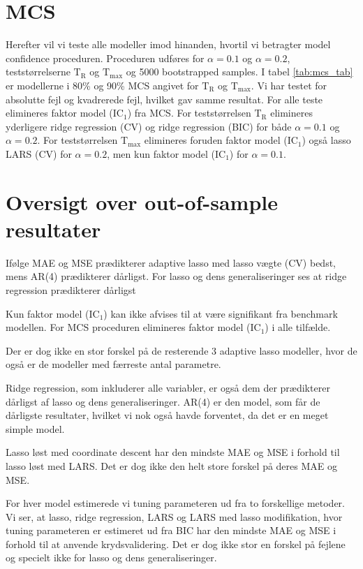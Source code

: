 \section{MCS} 
Herefter vil vi teste alle modeller imod hinanden, hvortil vi betragter model confidence proceduren.
Proceduren udføres for \(\alpha = 0.1\) og \(\alpha = 0.2\), teststørrelserne \(\text{T}_\text{R}\) og \(\text{T}_\text{max}\) og 5000 bootstrapped samples.
I tabel \ref{tab:mcs_tab} er modellerne i 80\% og 90\% MCS angivet for \(\text{T}_\text{R}\) og \(\text{T}_\text{max}\).
Vi har testet for absolutte fejl og kvadrerede fejl, hvilket gav samme resultat.
For alle teste elimineres faktor model (IC\(_1\)) fra MCS.
For teststørrelsen \(\text{T}_\text{R}\) elimineres yderligere ridge regression (CV) og ridge regression (BIC) for både \(\alpha = 0.1\) og \(\alpha = 0.2\).
For teststørrelsen \(\text{T}_\text{max}\) elimineres foruden faktor model (IC\(_1\)) også lasso LARS (CV) for \(\alpha = 0.2\), men kun faktor model (IC\(_1\)) for \(\alpha = 0.1\).
%

%

\section{Oversigt over out-of-sample resultater}
Ifølge MAE og MSE prædikterer adaptive lasso med lasso vægte (CV) bedst, mens AR(4) prædikterer dårligst.
For lasso og dens generaliseringer ses at ridge regression prædikterer dårligst


Kun faktor model (IC\(_1\)) kan ikke afvises til at være signifikant fra benchmark modellen.
For MCS proceduren elimineres faktor model (IC\(_1\)) i alle tilfælde.

Der er dog ikke en stor forskel på de resterende 3 adaptive lasso modeller, hvor de også er de modeller med færreste antal parametre. 

Ridge regression, som inkluderer alle variabler, er også dem der prædikterer dårligst af lasso og dens generaliseringer. 
AR(4) er den model, som får de dårligste resultater, hvilket vi nok også havde forventet, da det er en meget simple model. 

Lasso løst med coordinate descent har den mindste MAE og MSE i forhold til lasso løst med LARS. Det er dog ikke den helt store forskel på deres MAE og MSE. 

For hver model estimerede vi tuning parameteren ud fra to forskellige metoder. Vi ser, at lasso, ridge regression, LARS og LARS med lasso modifikation, hvor tuning parameteren er estimeret ud fra BIC har den mindste MAE og MSE i forhold til at anvende krydsvalidering. Det er dog ikke stor en forskel på fejlene og specielt ikke for lasso og dens generaliseringer. 

